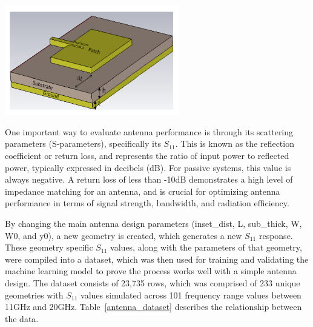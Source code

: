 \documentclass[conference]{IEEEtran}
\newenvironment{Figure}
    {\par\medskip\noindent\minipage{\linewidth}}
    {\endminipage\par\medskip}
\begin{document}
\begin{Figure}
    \centering
    \includegraphics[width=3in]{3D patch antenna.png}
    \label{3D view}
\end{Figure}

One important way to evaluate antenna performance is through its scattering parameters (S-parameters), specifically its $S_{11}$. This is known as the reflection coefficient or return loss, and represents the ratio of input power to reflected power, typically expressed in decibels (dB). For passive systems, this value is always negative. A return loss of less than -10dB demonstrates a high level of impedance matching for an antenna, and is crucial for optimizing antenna performance in terms of signal strength, bandwidth, and radiation efficiency. 

By changing the main antenna design parameters (inset\_dist, L, sub\_thick, W, W0, and y0), a new geometry is created, which generates a new $S_{11}$ response. These geometry specific $S_{11}$ values, along with the parameters of that geometry, were compiled into a dataset, which was then used for training and validating the machine learning model to prove the process works well with a simple antenna design. The dataset consists of 23,735 rows, which was comprised of 233 unique geometries with $S_{11}$ values simulated across 101 frequency range values between 11GHz and 20GHz. Table~\ref{antenna_dataset} describes the relationship between the data.
\end{document}
